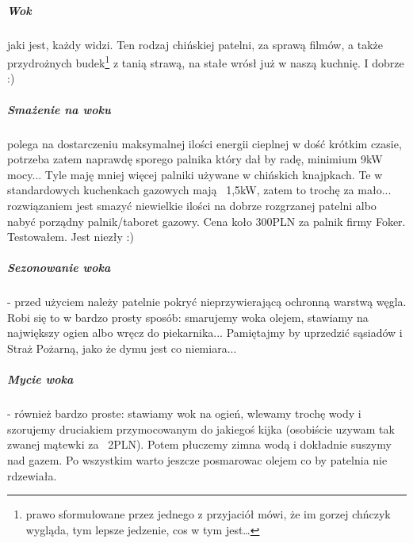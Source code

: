 \documentclass[./KNIGA.tex]{subfiles}
\begin{document}
\subparagraph{Wok} jaki jest, każdy widzi. Ten rodzaj chińskiej patelni, za sprawą filmów, a także przydrożnych budek\footnote{prawo sformułowane przez jednego z przyjaciół mówi, że im gorzej chńczyk wygląda, tym lepsze jedzenie, cos w tym jest\ldots} z tanią strawą, na stałe wrósł już w naszą kuchnię. I dobrze :)
\subparagraph{Smażenie na woku} polega na dostarczeniu maksymalnej ilości energii cieplnej w dość krótkim czasie, potrzeba zatem naprawdę sporego palnika który dał by radę, minimium 9kW mocy... Tyle maję mniej więcej palniki używane w chińskich knajpkach. Te w standardowych kuchenkach gazowych mają ~1,5kW, zatem to trochę za mało... rozwiązaniem jest smazyć niewielkie ilości na dobrze rozgrzanej patelni albo nabyć porządny palnik/taboret gazowy. Cena koło 300PLN za palnik firmy Foker. Testowałem. Jest niezły :)
\subparagraph{Sezonowanie woka} - przed użyciem należy patelnie pokryć nieprzywierającą ochronną warstwą węgla. Robi się to w bardzo prosty sposób: smarujemy woka olejem, stawiamy na największy ogien albo wręcz do piekarnika... Pamiętajmy by uprzedzić sąsiadów i Straż Pożarną, jako że dymu jest co niemiara...
\subparagraph{Mycie woka} - również bardzo proste: stawiamy wok na ogień, wlewamy trochę wody i szorujemy druciakiem przymocowanym do jakiegoś kijka (osobiście uzywam tak zwanej mątewki za ~2PLN). Potem płuczemy zimna wodą i dokładnie suszymy nad gazem. Po wszystkim warto jeszcze posmarowac olejem co by patelnia nie rdzewiała.
\end{document}
